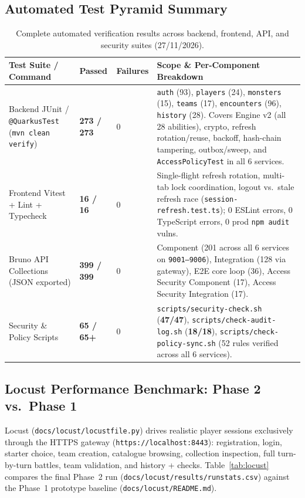 \documentclass[10.5pt,a4paper]{article}
\DeclareRobustCommand{\code}[1]{\begingroup\def\_{\textunderscore\allowbreak}\texttt{#1}\endgroup}
\newcommand{\badgeok}[1]{\textsf{\textbf{\color{okgreen}#1}}}
\begin{document}
\subsection{Automated Test Pyramid Summary}

\begin{table}[H]
\centering
\caption{Complete automated verification results across backend, frontend, API, and security suites (27/11/2026).}
\label{tab:tests}
\footnotesize
\begin{tabularx}{\linewidth}{@{}L{4.0cm}C{1.9cm}C{1.6cm}Y@{}}
\toprule
\textbf{Test Suite / Command} & \textbf{Passed} & \textbf{Failures} & \textbf{Scope \& Per-Component Breakdown} \\
\midrule
Backend JUnit / \code{@QuarkusTest} (\code{mvn clean verify}) & \badgeok{273 / 273} & 0 &
\code{auth} (93), \code{players} (24), \code{monsters} (15), \code{teams} (17), \code{encounters} (96), \code{history} (28). Covers Engine v2 (all 28 abilities), crypto, refresh rotation/reuse, backoff, hash-chain tampering, outbox/sweep, and \code{AccessPolicyTest} in all 6 services. \\
\addlinespace
Frontend Vitest + Lint + Typecheck & \badgeok{16 / 16} & 0 &
Single-flight refresh rotation, multi-tab lock coordination, logout vs.\ stale refresh race (\code{session-refresh.test.ts}); 0 ESLint errors, 0 TypeScript errors, 0 prod \code{npm audit} vulns. \\
\addlinespace
Bruno API Collections (JSON exported) & \badgeok{399 / 399} & 0 &
Component (201 across all 6 services on \code{9001–9006}), Integration (128 via gateway), E2E core loop (36), Access Security Component (17), Access Security Integration (17). \\
\addlinespace
Security \& Policy Scripts & \badgeok{65 / 65+} & 0 &
\code{scripts/security-check.sh} (\textbf{47/47}), \code{scripts/check-audit-log.sh} (\textbf{18/18}), \code{scripts/check-policy-sync.sh} (52 rules verified across all 6 services). \\
\bottomrule
\end{tabularx}
\end{table}

\subsection{Locust Performance Benchmark: Phase 2 vs.\ Phase 1}

Locust (\code{docs/locust/locustfile.py}) drives realistic player sessions exclusively through the HTTPS gateway (\code{https://localhost:8443}): registration, login, starter choice, team creation, catalogue browsing, collection inspection, full turn-by-turn battles, team validation, and history +  checks. Table~\ref{tab:locust} compares the final Phase~2 run (\code{docs/locust/results/run\_stats.csv}) against the Phase~1 prototype baseline (\code{docs/locust/README.md}).
\end{document}
